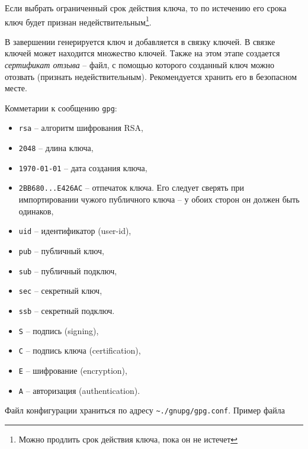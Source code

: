 \documentclass[%
	11pt,
	a4paper,
	utf8,
		]{article}
\begin{document}
Если выбрать ограниченный срок действия ключа, то по истечению его срока ключ будет признан недействительным\footnote{Можно продлить срок действия ключа, пока он не истечет}.

В завершении генерируется ключ и добавляется в связку ключей. В связке ключей может находится множество ключей. Также на этом этапе создается \emph{сертификат отзыва} -- файл, с помощью которого созданный ключ можно отозвать (признать недействительным). Рекомендуется хранить его в безопасном месте.

Комметарии к сообщению \texttt{gpg}:

\begin{itemize}
	\item \texttt{rsa} -- алгоритм шифрования RSA,
	
	\item \texttt{2048} -- длина ключа,
	
	\item \texttt{1970-01-01} -- дата создания ключа,
	
	\item \texttt{2BB680...E426AC} -- отпечаток ключа. Его следует сверять при импортировании чужого публичного ключа -- у обоих сторон он должен быть одинаков, 
	
	\item \texttt{uid} -- идентификатор (user-id),
	
	\item \texttt{pub} -- публичный ключ,
	
	\item \texttt{sub} -- публичный подключ,
	
	\item \texttt{sec} -- секретный ключ,
	
	\item \texttt{ssb} -- секретный подключ.
	
   \item \texttt{S} -- подпись (signing),
   
   \item \texttt{C} -- подпись ключа (certification),
   
   \item \texttt{E} -- шифрование (encryption),
   
   \item \texttt{A} -- авторизация (authentication).
\end{itemize}

Файл конфигурации храниться по адресу \lstinline{~./gnupg/gpg.conf}. Пример файла
\end{document}
